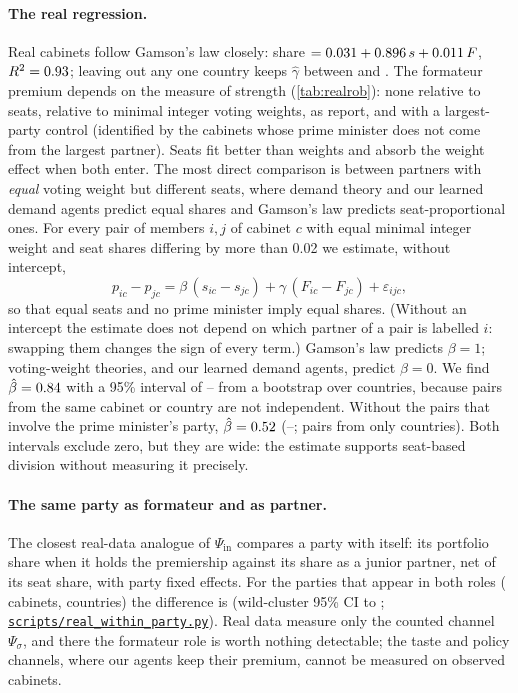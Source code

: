 \documentclass[11pt,a4paper]{article}
\newcommand{\repo}{https://github.com/bot2048/cabinet-bargaining-marl}
\newcommand{\code}[1]{\href{\repo/blob/main/#1}{\texttt{\small #1}}}
\begin{document}
\paragraph{The real regression.} Real cabinets follow Gamson's law closely: share $=0.031+0.896\,s+
0.011\,F$, $R^2=0.93$; leaving out any one country keeps $\hat\gamma$ between \LocoLo{} and
\LocoHi. The formateur premium depends on the measure of strength (\cref{tab:realrob}): none relative to
seats, \RobWeightsG{} relative to minimal integer voting weights, as \citet{ansolabehere2005} report, and
\RobLargestG{} with a largest-party control (identified by the \RobPmNotLargest{} cabinets whose prime
minister does not come from the largest partner). Seats fit better than weights and absorb the weight
effect when both enter. The most direct comparison is between partners with \emph{equal} voting weight but different seats,
where demand theory and our learned demand agents predict equal shares and Gamson's law predicts
seat-proportional ones. For every pair of members $i,j$ of cabinet $c$ with equal minimal integer weight and seat shares
differing by more than 0.02 we estimate, without intercept,
\begin{equation}\label{eq:pairs}
p_{ic}-p_{jc}=\beta\,(s_{ic}-s_{jc})+\gamma\,(F_{ic}-F_{jc})+\varepsilon_{ijc},
\end{equation}
so that equal seats and no prime minister imply equal shares. (Without an intercept the estimate does not
depend on which partner of a pair is labelled $i$: swapping them changes the sign of every term.) Gamson's law predicts $\beta=1$; voting-weight
theories, and our learned demand agents, predict $\beta=0$. We find $\hat\beta=0.84$ with a 95\%
interval of \WvsLo--\WvsHi{} from a bootstrap over countries, because pairs from the same cabinet or
country are not independent. Without the pairs that involve the prime minister's party,
$\hat\beta=0.52$ (\WvsNoPmLo--\WvsNoPmHi; \WvsNoPmN{} pairs from only \WvsNoPmCountries{}
countries). Both intervals exclude zero, but they are wide: the estimate supports seat-based division
without measuring it precisely.

\paragraph{The same party as formateur and as partner.} The closest real-data analogue of
$\Psi_{\mathrm{in}}$ compares a party with itself: its portfolio share when it holds the premiership
against its share as a junior partner, net of its seat share, with party fixed effects. For the
\WithinParties{} parties that appear in both roles (\WithinCabinets{} cabinets, \WithinCountries{}
countries) the difference is \WithinG{} (wild-cluster 95\% CI \WithinLo{} to \WithinHi;
\code{scripts/real\_within\_party.py}). Real data measure only the counted channel $\Psi_\sigma$, and
there the formateur role is worth nothing detectable; the taste and policy channels, where our agents keep
their premium, cannot be measured on observed cabinets.
\end{document}
